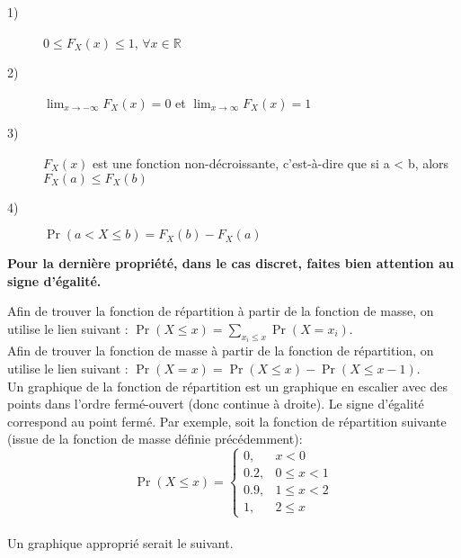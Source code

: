 \documentclass[10pt, french]{article}
\begin{document}
\begin{multicols*}{2}
\begin{definitionNOHFILLsub}
\begin{definitionNOHFILLprop}
\begin{description}
  \item[1)] $0 \leq F_X(x) \leq 1$, $\forall x \in \mathbb{R}$ 
  \item[2)] $\lim_{x \to -\infty} F_X(x) = 0$ et $\lim_{x \to \infty} F_X(x) = 1$
  \item[3)] $F_X(x)$ est une fonction non-décroissante, c'est-à-dire que si a < b, alors $F_X(a) \leq F_X(b)$ 
  \item[4)] $\Pr(a < X \leq b) = F_X(b) - F_X(a)$
\end{description}
\textbf{Pour la dernière propriété, dans le cas discret, faites bien attention au signe d'égalité.}
\end{definitionNOHFILLprop}

Afin de trouver la fonction de répartition à partir de la fonction de masse, on utilise le lien suivant : $\Pr(X \leq x) = \sum_{x_i \leq x} \Pr(X = x_i)$.\\

 Afin de trouver la fonction de masse à partir de la fonction de répartition, on utilise le lien suivant : $\Pr(X = x) = \Pr(X \leq x) - \Pr(X \leq x - 1)$.\\


Un graphique de la fonction de répartition est un graphique en escalier avec des points dans l'ordre fermé-ouvert (donc continue à droite). Le signe d'égalité correspond au point fermé. Par exemple, soit la fonction de répartition suivante (issue de la fonction de masse définie précédemment):\\

$$\Pr(X \leq x) = 
    \left\{
    	\begin{array}{ll}
    		0, & x < 0\\
    		0.2,  &  0 \leq x < 1\\
    		0.9, & 1 \leq x < 2\\
    		1, & 2 \leq x
    	\end{array}
    \right.
    $$\\
    
Un graphique approprié serait le suivant.\\

\begin{center}
\end{center}


\end{definitionNOHFILLsub}
\end{multicols*}
\end{document}
